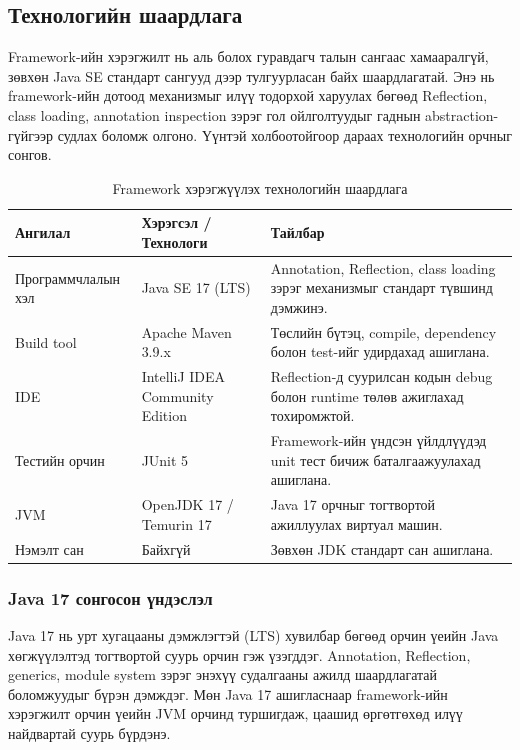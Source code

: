 \subsection{Технологийн шаардлага}

Framework-ийн хэрэгжилт нь аль болох гуравдагч талын сангаас хамааралгүй, зөвхөн Java SE стандарт сангууд дээр тулгуурласан байх шаардлагатай. Энэ нь framework-ийн дотоод механизмыг илүү тодорхой харуулах бөгөөд Reflection, class loading, annotation inspection зэрэг гол ойлголтуудыг гаднын abstraction-гүйгээр судлах боломж олгоно. Үүнтэй холбоотойгоор дараах технологийн орчныг сонгов.

\begin{table}[H]
\centering
\caption{Framework хэрэгжүүлэх технологийн шаардлага}
\label{tab:technology-requirements}
\renewcommand{\arraystretch}{1.3}
\begin{tabular}{|p{3.3cm}|p{3.2cm}|p{6.3cm}|}
\hline
\textbf{Ангилал} & \textbf{Хэрэгсэл / Технологи} & \textbf{Тайлбар} \\ \hline
Программчлалын хэл & Java SE 17 (LTS) & Annotation, Reflection, class loading зэрэг механизмыг стандарт түвшинд дэмжинэ. \\ \hline
Build tool & Apache Maven 3.9.x & Төслийн бүтэц, compile, dependency болон test-ийг удирдахад ашиглана. \\ \hline
IDE & IntelliJ IDEA Community Edition & Reflection-д суурилсан кодын debug болон runtime төлөв ажиглахад тохиромжтой. \\ \hline
Тестийн орчин & JUnit 5 & Framework-ийн үндсэн үйлдлүүдэд unit тест бичиж баталгаажуулахад ашиглана. \\ \hline
JVM & OpenJDK 17 / Temurin 17 & Java 17 орчныг тогтвортой ажиллуулах виртуал машин. \\ \hline
Нэмэлт сан & Байхгүй & Зөвхөн JDK стандарт сан ашиглана. \\ \hline
\end{tabular}
\end{table}

\subsubsection{Java 17 сонгосон үндэслэл}

Java 17 нь урт хугацааны дэмжлэгтэй (LTS) хувилбар бөгөөд орчин үеийн Java хөгжүүлэлтэд тогтвортой суурь орчин гэж үзэгддэг. Annotation, Reflection, generics, module system зэрэг энэхүү судалгааны ажилд шаардлагатай боломжуудыг бүрэн дэмждэг. Мөн Java 17 ашигласнаар framework-ийн хэрэгжилт орчин үеийн JVM орчинд туршигдаж, цаашид өргөтгөхөд илүү найдвартай суурь бүрдэнэ.

